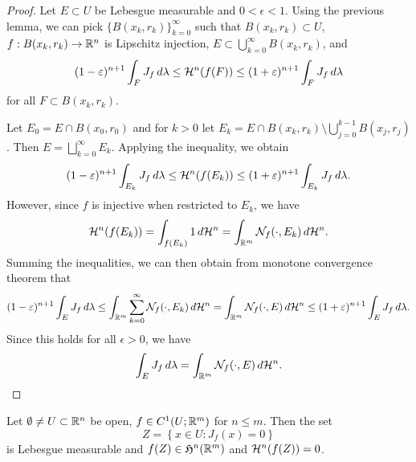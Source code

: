\documentclass[a4paper]{article}
\renewcommand{\cupinfk}{\bigcup_{k=0}^\infty}
\renewcommand{\sqcupinfk}{\bigsqcup_{k=0}^\infty}
\renewcommand{\suminfk}{\sum_{k=0}^\infty}
\renewcommand{\seqinfk}[1]{\{ #1 \}_{k=0}^\infty}
\renewcommand{\cupj}{\bigcup_{j=0}}
\begin{document}
\begin{proof}
  Let $E \subset U$ be Lebesgue measurable and $0 < \epsilon < 1$. Using
  the previous lemma, we can pick $\seqinfk{B(x_k, r_k)}$ such that
  $B(x_k, r_k) \subset U$, $f : B(x_k, r_k) \to \mathbb{R}^n$ is Lipschitz
  injection, $E \subset \cupinfk B(x_k, r_k)$, and
  \[
    (1 - \varepsilon)^{n+1} \int_F J_f \, d \lambda
    \leq \mathcal{H}^n (f(F))
    \leq (1 + \varepsilon)^{n+1} \int_F J_f \, d \lambda
  \]
  for all $F \subset B(x_k, r_k)$.

  Let $E_0 = E \cap B(x_0, r_0)$ and for $k > 0$ let $E_k = E \cap B(x_k,
  r_k) \setminus \cupj^{k-1} B(x_j, r_j)$. Then $E = \sqcupinfk E_k$.
  Applying the inequality, we obtain
  \[
    (1 - \varepsilon)^{n+1} \int_{E_k} J_f \, d \lambda
    \leq \mathcal{H}^n (f(E_k))
    \leq (1 + \varepsilon)^{n+1} \int_{E_k} J_f \, d \lambda.
  \]
  However, since $f$ is injective when restricted to $E_k$, we have
  \[
    \mathcal{H}^n (f(E_k))
    = \int_{f(E_k)} 1 \, d \mathcal{H}^n
    = \int_{\mathbb{R}^m} \mathcal{N}_f(\cdot, E_k) \, d \mathcal{H}^n.
  \]
  Summing the inequalities, we can then obtain from monotone convergence
  theorem that
  \[
    (1 - \epsilon)^{n+1} \int_E J_f \d \lambda
    \leq \int_{\R^m} \suminfk \ncal_f(\cdot, E_k) \d \hcal^n
    = \int_{\R^m} \ncal_f(\cdot, E) \d \hcal^n
    \leq (1 + \epsilon)^{n+1} \int_E J_f \d \lambda.
  \]
  Since this holds for all $\epsilon > 0$, we have
  \[
    \int_E J_f \, d \lambda = \int_{\mathbb{R}^m} \mathcal{N}_f(\cdot, E) \, d \mathcal{H}^n.
  \]
\end{proof}

\begin{thm}
  Let $\emptyset \neq U \subset \mathbb{R}^n$ be open, $f \in C^1 (U;
    \mathbb{R}^m)$ for $n \leq m$. Then the set
  \[
    Z = \left\{ x \in U: J_f(x) = 0 \right\}
  \]
  is Lebesgue measurable and $f(Z) \in \mathfrak{H}^n(\mathbb{R}^m)$ and $\mathcal{H}^n (f(Z)) =
  0$.
\end{thm}
\end{document}

